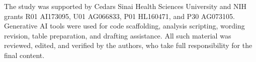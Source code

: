 \documentclass[sigconf]{acmart}
\begin{document}
\begin{acks}
The study was supported by Cedars Sinai Health Sciences University and NIH grants R01 AI173095, U01 AG066833, P01 HL160471, and P30 AG073105. Generative AI tools were used for code scaffolding, analysis scripting, wording revision, table preparation, and drafting assistance. All such material was reviewed, edited, and verified by the authors, who take full responsibility for the final content.

\end{acks}

\balance



\end{document}

